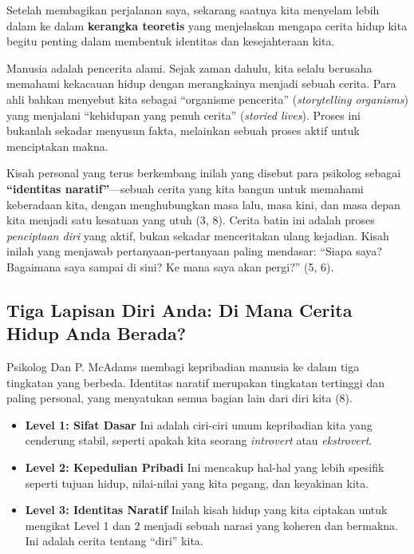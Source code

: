 \documentclass[
  letterpaper,
  DIV=11,
  numbers=noendperiod]{scrreprt}
\begin{document}
Setelah membagikan perjalanan saya, sekarang saatnya kita menyelam lebih
dalam ke dalam \textbf{kerangka teoretis} yang menjelaskan mengapa
cerita hidup kita begitu penting dalam membentuk identitas dan
kesejahteraan kita.

Manusia adalah pencerita alami. Sejak zaman dahulu, kita selalu berusaha
memahami kekacauan hidup dengan merangkainya menjadi sebuah cerita. Para
ahli bahkan menyebut kita sebagai ``organisme pencerita''
(\emph{storytelling organisms}) yang menjalani ``kehidupan yang penuh
cerita'' (\emph{storied lives}). Proses ini bukanlah sekadar menyusun
fakta, melainkan sebuah proses aktif untuk menciptakan makna.

Kisah personal yang terus berkembang inilah yang disebut para psikolog
sebagai \textbf{``identitas naratif''}---sebuah cerita yang kita bangun
untuk memahami keberadaan kita, dengan menghubungkan masa lalu, masa
kini, dan masa depan kita menjadi satu kesatuan yang utuh (3, 8). Cerita
batin ini adalah proses \emph{penciptaan diri} yang aktif, bukan sekadar
menceritakan ulang kejadian. Kisah inilah yang menjawab
pertanyaan-pertanyaan paling mendasar: ``Siapa saya? Bagaimana saya
sampai di sini? Ke mana saya akan pergi?'' (5, 6).

\subsection{Tiga Lapisan Diri Anda: Di Mana Cerita Hidup Anda
Berada?}\label{tiga-lapisan-diri-anda-di-mana-cerita-hidup-anda-berada}

Psikolog Dan P. McAdams membagi kepribadian manusia ke dalam tiga
tingkatan yang berbeda. Identitas naratif merupakan tingkatan tertinggi
dan paling personal, yang menyatukan semua bagian lain dari diri kita
(8).

\begin{itemize}
\item
  \textbf{Level 1: Sifat Dasar} Ini adalah ciri-ciri umum kepribadian
  kita yang cenderung stabil, seperti apakah kita seorang
  \emph{introvert} atau \emph{ekstrovert}.
\item
  \textbf{Level 2: Kepedulian Pribadi} Ini mencakup hal-hal yang lebih
  spesifik seperti tujuan hidup, nilai-nilai yang kita pegang, dan
  keyakinan kita.
\item
  \textbf{Level 3: Identitas Naratif} Inilah kisah hidup yang kita
  ciptakan untuk mengikat Level 1 dan 2 menjadi sebuah narasi yang
  koheren dan bermakna. Ini adalah cerita tentang ``diri'' kita.
\end{itemize}
\end{document}
